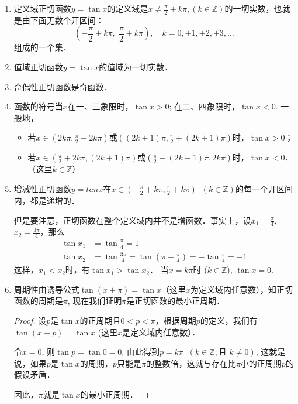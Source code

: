 \begin{enumerate}
    \item 定义域\quad  正切函数$y=\tan x$的定义域是$x\ne \frac{\pi}{2}+k\pi, 
(k\in\mathbb{Z})$的一切实数，也就是由下面无数个开区间：
\[\left(-\frac{\pi}{2}+k\pi,\; \frac{\pi}{2}+k\pi\right),\quad k=0,\pm1,\pm2,\pm3,\ldots \]
组成的一个集．
\item 值域\quad  正切函数$y=\tan x$的值域为一切实数．
\item 奇偶性\quad 正切函数是奇函数．
\item 函数的符号\quad 当$x$在一、三象限时，$\tan x>0$; 在二、四象限时，$\tan x<0$. 一般地，
\begin{itemize}
    \item 若$x\in\left(2k\pi,\frac{\pi}{2}+2k\pi\right)$或$\left((2k+1)\pi,\frac{\pi}{2}+(2k+1)\pi\right)$时，$\tan x>0$；
    \item 若$x\in\left(\frac{\pi}{2}+2k\pi,(2k+1)\pi\right)$或$\left(\frac{\pi}{2}+(2k+1)\pi, 2k\pi\right)$时，$\tan x<0$．（这里$k\in\mathbb{Z}$）
\end{itemize}

 \item 增减性\quad 正切函数$y=tan x$在$x\in\left(-\frac{\pi}{2}+k\pi,\frac{\pi}{2}+k\pi\right)\;\; (k\in\mathbb{Z})$的每一个开区间内，都是递增的．

 但是要注意，正切函数在整个定义域内并不是增函数．事实上，设$x_1=\frac{\pi}{4}$, $x_2=\frac{3\pi}{4}$，那么
 \[\begin{split}
     \tan x_1&=\tan\frac{\pi}{4}=1\\
     \tan x_2&=\tan\frac{3\pi}{4}=\tan\left(\pi-\frac{\pi}{4}\right)=-\tan\frac{\pi}{4}=-1
 \end{split}\]
这样，$x_1<x_2$时，有$\tan x_1>\tan x_2$．
 当$x=k\pi$时 ($k\in\mathbb{Z}$), $\tan x=0$.
 
 \item 周期性\quad 由诱导公式$\tan (x+\pi)=\tan x$（这里$x$为定义域内任意数），知正切函数的周期是$\pi$, 现在我们证明$\pi$是正切函数的最小正周期．
 
\begin{proof}
    设$p$是$\tan x$的正周期且$0<p<\pi$，根据周期$p$的定义，我们有
$\tan (x+p)=\tan x$ (这里$x$是定义域内任意数）．

令$x=0$, 则$\tan p=\tan 0=0$, 由此得到$p=k\pi\;\; (k\in\mathbb{Z}, \text{且 }k\ne 0)$, 这就是说，如果$p$是$\tan x$的周期，$p$只能是$\pi$的整数倍，这就与存在比$\pi$小的正周期$p$的假设矛盾．

因此，$\pi$就是$\tan x$的最小正周期．
\end{proof}


\end{enumerate}
